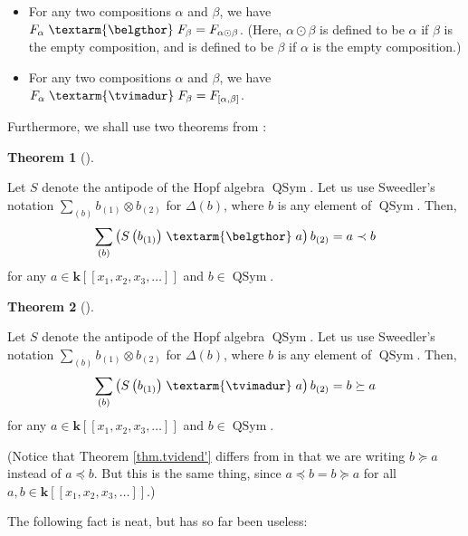 \documentclass[numbers=enddot,12pt,final,onecolumn,notitlepage]{scrartcl}%
\theoremstyle{definition}
\newtheorem{theo}{Theorem}[section]
\newenvironment{theorem}[1][]
{\begin{theo}[#1]\begin{leftbar}}
{\end{leftbar}\end{theo}}
\newenvironment{verlong}{}{}
\newenvironment{noncompile}{}{}
\newcommand{\tvi}{\left. \textarm{\tvimadur} \right.}
\newcommand{\bel}{\left. \textarm{\belgthor} \right.}
\let\sumnonlimits\sum
\renewcommand{\sum}{\sumnonlimits\limits}
\begin{document}
\begin{verlong}
\begin{itemize}
\item For any two compositions $\alpha$ and $\beta$, we have $F_{\alpha
}\bel  F_{\beta}=F_{\alpha\odot\beta}$. (Here, $\alpha\odot\beta$ is defined
to be $\alpha$ if $\beta$ is the empty composition, and is defined to be
$\beta$ if $\alpha$ is the empty composition.)

\item For any two compositions $\alpha$ and $\beta$, we have $F_{\alpha
}\tvi  F_{\beta}=F_{\left[  \alpha,\beta\right]  }$.
\end{itemize}

Furthermore, we shall use two theorems from \cite[detailed version, Section
3]{dimcr}:

\begin{theorem}
\label{thm.beldend}Let $S$ denote the antipode of the Hopf algebra
$\operatorname*{QSym}$. Let us use Sweedler's notation $\sum_{\left(
b\right)  }b_{\left(  1\right)  }\otimes b_{\left(  2\right)  }$ for
$\Delta\left(  b\right)  $, where $b$ is any element of $\operatorname*{QSym}%
$. Then,%
\[
\sum_{\left(  b\right)  }\left(  S\left(  b_{\left(  1\right)  }\right)
\bel  a\right)  b_{\left(  2\right)  }=a\left.  \prec\right.  b
\]
for any $a\in\mathbf{k}\left[  \left[  x_{1},x_{2},x_{3},\ldots\right]
\right]  $ and $b\in\operatorname*{QSym}$.
\end{theorem}

\begin{theorem}
\label{thm.tvidend'}Let $S$ denote the antipode of the Hopf algebra
$\operatorname*{QSym}$. Let us use Sweedler's notation $\sum_{\left(
b\right)  }b_{\left(  1\right)  }\otimes b_{\left(  2\right)  }$ for
$\Delta\left(  b\right)  $, where $b$ is any element of $\operatorname*{QSym}%
$. Then,%
\[
\sum_{\left(  b\right)  }\left(  S\left(  b_{\left(  1\right)  }\right)
\tvi  a\right)  b_{\left(  2\right)  }=b\left.  \succeq\right.  a
\]
for any $a\in\mathbf{k}\left[  \left[  x_{1},x_{2},x_{3},\ldots\right]
\right]  $ and $b\in\operatorname*{QSym}$.
\end{theorem}

(Notice that Theorem \ref{thm.tvidend'} differs from \cite[detailed version,
Theorem 3.15]{dimcr} in that we are writing $b\left.  \succeq\right.  a$
instead of $a\left.  \preceq\right.  b$. But this is the same thing, since
$a\left.  \preceq\right.  b=b\left.  \succeq\right.  a$ for all $a,b\in
\mathbf{k}\left[  \left[  x_{1},x_{2},x_{3},\ldots\right]  \right]  $.)

\begin{noncompile}
The following fact is neat, but has so far been useless:


\end{noncompile}
\end{verlong}
\end{document}
